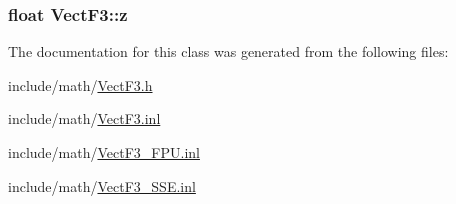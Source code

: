 \hypertarget{classVectF3_a6ada1ce72aa27f56e4b529a28c0789c4}{
\subsubsection[{z}]{\setlength{\rightskip}{0pt plus 5cm}float Vect\-F3\-::z}}\label{classVectF3_a6ada1ce72aa27f56e4b529a28c0789c4}


The documentation for this class was generated from the following files\-:\begin{DoxyCompactItemize}
\item 
include/math/\hyperlink{VectF3_8h}{Vect\-F3.\-h}\item 
include/math/\hyperlink{VectF3_8inl}{Vect\-F3.\-inl}\item 
include/math/\hyperlink{VectF3__FPU_8inl}{Vect\-F3\-\_\-\-F\-P\-U.\-inl}\item 
include/math/\hyperlink{VectF3__SSE_8inl}{Vect\-F3\-\_\-\-S\-S\-E.\-inl}\end{DoxyCompactItemize}
